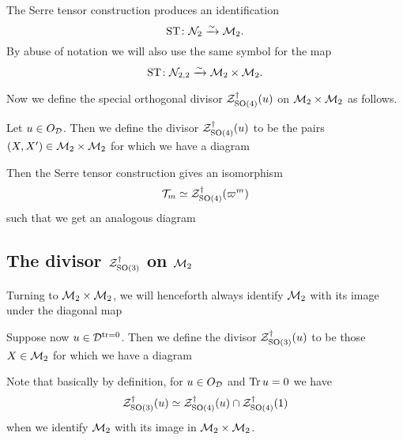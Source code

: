 \begin{proposition}
  The Serre tensor construction produces an identification
  \[ \operatorname{ST} \colon \mathcal N_2 \xrightarrow{\sim} \mathcal M_2. \]
  By abuse of notation we will also use the same symbol for the map
  \[ \operatorname{ST} \colon \mathcal N_{2,2} \xrightarrow{\sim} \mathcal M_2 \times \mathcal M_2. \]
\end{proposition}

Now we define the special orthogonal divisor $\mathcal Z^{\dagger}_{\operatorname{SO}(4)}(u)$
on $\mathcal M_2 \times \mathcal M_2$ as follows.
\begin{definition}
  Let $u \in O_\mathcal D$.
  Then we define the divisor $\mathcal Z^{\dagger}_{\operatorname{SO}(4)}(u)$ to be
  the pairs $(X, X') \in \mathcal M_2 \times \mathcal M_2$
  for which we have a diagram
  \begin{center}
  \end{center}
\end{definition}
Then the Serre tensor construction gives an isomorphism
\[ \mathcal{T}_m \simeq \mathcal Z^{\dagger}_{\operatorname{SO}(4)}(\varpi^m) \]
such that we get an analogous diagram
\begin{center}
\end{center}

\subsection{The divisor $\mathcal Z^{\dagger}_{\operatorname{SO}(3)}$ on $\mathcal M_2$}
Turning to $\mathcal M_2 \times \mathcal M_2$, we will henceforth always identify $\mathcal M_2$
with its image under the diagonal map
\begin{center}
\end{center}

\begin{definition}
  Suppose now $u \in \mathcal D^{\operatorname{tr} = 0}$.
  Then we define the divisor $\mathcal Z^{\dagger}_{\operatorname{SO}(3)}(u)$ to be those $X \in \mathcal M_2$
  for which we have a diagram
  \begin{center}
  \end{center}
  Note that basically by definition, for $u \in O_\mathcal D$ and $\operatorname{Tr} u = 0$ we have
  \[ \mathcal Z^{\dagger}_{\operatorname{SO}(3)}(u) \simeq \mathcal Z^{\dagger}_{\operatorname{SO}(4)}(u) \cap \mathcal Z^{\dagger}_{\operatorname{SO}(4)}(1) \]
  when we identify $\mathcal M_2$ with its image in $\mathcal M_2 \times \mathcal M_2$.
\end{definition}

